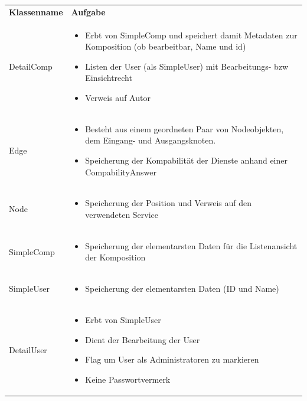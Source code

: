 \begin{table}
	\begin{tabularx}{\textwidth}{p{} | X}
		\rowcolor[HTML]{C0C0C0}
		\textbf{Klassenname} & \textbf{Aufgabe} \\
		DetailComp & \compress \begin{itemize}
			\item Erbt von SimpleComp und speichert damit Metadaten zur Komposition (ob bearbeitbar, Name und id)
			\item Listen der User (als SimpleUser) mit Bearbeitungs- bzw Einsichtrecht
			\item Verweis auf Autor
		\end{itemize}\\
		\rowcolor[HTML]{E7E7E7}
		Edge & \compress \begin{itemize}
		  \item Besteht aus einem geordneten Paar von Nodeobjekten, dem Eingang- und Ausgangsknoten.
			\item Speicherung der Kompabilität der Dienste anhand einer CompabilityAnswer
		\end{itemize}\\
		Node & \compress \begin{itemize}
			\item Speicherung der Position und Verweis auf den verwendeten Service 
		\end{itemize}\\
		\rowcolor[HTML]{E7E7E7}
		SimpleComp & \compress \begin{itemize}
			\item Speicherung der elementarsten Daten für die Listenansicht der Komposition
		\end{itemize}\\
		SimpleUser  & \compress \begin{itemize}
			\item Speicherung der elementarsten Daten (ID und Name)
		\end{itemize}\\
		\rowcolor[HTML]{E7E7E7}
		DetailUser & \compress \begin{itemize}
			\item Erbt von SimpleUser
			\item Dient der Bearbeitung der User
			\item Flag um User als Administratoren zu markieren
			\item Keine Passwortvermerk
		\end{itemize}\\

\end{tabularx}
\end{table}

